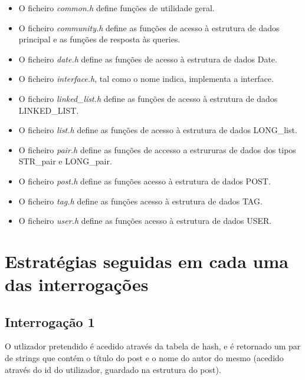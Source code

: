 \documentclass[10pt]{report}
\newcommand\tab[1][0.5cm]{\hspace*{#1}}
\begin{document}
\begin{itemize}

\item O ficheiro \textit{common.h} define funções de utilidade geral.

\item O ficheiro \textit{community.h} define as funções de acesso à estrutura de dados principal e as funções de resposta às queries.

\item O ficheiro \textit{date.h} define as funções de acesso à estrutura de dados Date.

\item O ficheiro \textit{interface.h}, tal como o nome indica, implementa a interface.

\item O ficheiro \textit{linked\_list.h} define as funções de acesso à estrutura de dados LINKED\_LIST.

\item O ficheiro \textit{list.h} define as funções de acesso à estrutura de dados LONG\_list.

\item O ficheiro \textit{pair.h} define as funções de accesso a estrururas de dados dos tipos STR\_pair e LONG\_pair.

\item O ficheiro \textit{post.h} define as funções acesso à estrutura de dados POST.

\item O ficheiro \textit{tag.h} define as funções acesso à estrutura de dados TAG.

\item O ficheiro \textit{user.h} define as funções acesso à estrutura de dados USER.

\end{itemize}

\section{Estratégias seguidas em cada uma das interrogações}

\subsection{Interrogação 1}
\tab O utlizador pretendido é acedido através da tabela de hash, e é retornado um par de strings que contém o título do post e o nome do autor do mesmo (acedido através do id do utilizador, guardado na estrutura do post).
\end{document}
